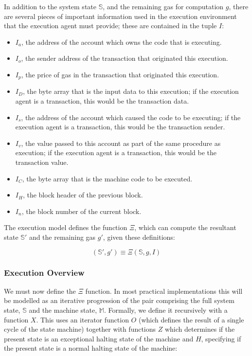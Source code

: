 \documentclass[9pt,oneside]{amsart}
\begin{document}
\begin{multicols}{2}
In addition to the system state $\mathbb{S}$, and the remaining gas for computation $g$, there are several pieces of important information used in the execution environment that the execution agent must provide; these are contained in the tuple $I$:

\begin{itemize}
\item $I_a$, the address of the account which owns the code that is executing.
\item $I_o$, the sender address of the transaction that originated this execution.
\item $I_p$, the price of gas in the transaction that originated this execution.
\item $I_D$, the byte array that is the input data to this execution; if the execution agent is a transaction, this would be the transaction data.
\item $I_s$, the address of the account which caused the code to be executing; if the execution agent is a transaction, this would be the transaction sender.
\item $I_v$, the value passed to this account as part of the same procedure as execution; if the execution agent is a transaction, this would be the transaction value.
\item $I_C$, the byte array that is the machine code to be executed.
\item $I_H$, the block header of the previous block.
\item $I_n$, the block number of the current block.
\end{itemize}

The execution model defines the function $\Xi$, which can compute the resultant state $\mathbb{S}'$ and the remaining gas $g'$, given these definitions:

\begin{equation}
(\mathbb{S}', g') \equiv \Xi(\mathbb{S}, g, I)
\end{equation}

\subsubsection{Execution Overview}

We must now define the $\Xi$ function. In most practical implementations this will be modelled as an iterative progression of the pair comprising the full system state, $\mathbb{S}$ and the machine state, $\mathbb{M}$. Formally, we define it recursively with a function $X$. This uses an iterator function $O$ (which defines the result of a single cycle of the state machine) together with functions $Z$ which determines if the present state is an exceptional halting state of the machine and $H$, specifying if the present state is a normal halting state of the machine:


\end{multicols}
\end{document}

